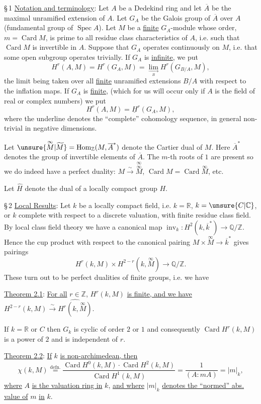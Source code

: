 
\S\,1 \uline{Notation and terminology}: Let $A$ be a Dedekind ring and let $\overline A$ be the maximal unramified extension of $A$. Let $G_A$ be the Galois group of $\overline A$ over $A$ (fundamental group of $\operatorname{Spec} A$). Let $M$ be a \uline{finite} $G_A$-module whose order, $m=\operatorname{Card} M$, is prime to all residue class characteristics of $A$, i.e. such that $\operatorname{Card} M$ is invertible in $A$. Suppose that $G_A$ operates continuously on $M$, i.e. that some open subgroup operates trivially. If $G_A$ is \uline{infinite}, we put
\[
H^r(A,M)=H^r(G_A,M)=\lim_{\underset B\longrightarrow} H^r(G_{B/A},M),
\]
the limit being taken over all \uline{finite} unramified extensions $B/A$ with respect to the inflation maps. If $G_A$ is \uline{finite}, (which for us will occur only if $A$ is the field of real or complex numbers) we put
\[
H^r(A,M)=\underline H^r(G_A,M),
\]
where the underline denotes the ``complete'' cohomology sequence, in general non-trivial in negative dimensions.

Let $\unsure{\overset{\infty}{M}|\widetilde M}=\operatorname{Hom}_{\mathbb Z}(M,\overline A^*)$ denote the Cartier dual of $M$. Here $\overline A^*$ denotes the group of invertible elements of $\overline A$. The $m$-th roots of $1$ are present so we do indeed have a perfect duality: $M\xrightarrow{\sim}\overset{\infty}{\overset{\infty}{M}}$, $\operatorname{Card} M=\operatorname{Card}\overset{\infty}{M}$, etc.

Let $\widehat H$ denote the  dual of a locally compact group $H$.

\S\,2 \uline{Local Results}: Let $k$ be a locally compact field, i.e. $k=\mathbb R$, $k=\unsure{C|\mathbb C}$, or $k$ complete with respect to a discrete valuation, with finite residue class field. By local class field theory we have a canonical map $\operatorname{inv}_k:H^2(k,\overline k^*)\longrightarrow\mathbb Q/\mathbb Z$. Hence the cup product with respect to the canonical pairing  $M\times\overset{\infty}{M}\longrightarrow\overline k^*$ gives pairings
\[
H^r(k,M)\times H^{2-r}(k,\overset{\infty}{M})\longrightarrow\mathbb Q/\mathbb Z.
\]
These turn out to be perfect dualities of finite groups, i.e. we have

\uline{Theorem 2.1}: \uline{For all} $r\in\mathbb Z$, $H^r(k,M)$ \uline{is finite, and we have}
$H^{2-r}(k,M)\xrightarrow{\sim}\widehat{H^r(k,\overset{\infty}{M})}$.

If $k=\mathbb R$ or $C$ then $G_k$ is cyclic of order $2$ or $1$ and consequently $\operatorname{Card} H^r(k,M)$ is a power of $2$ and is independent of $r$.

\uline{Theorem 2.2}: \uline{If} $k$ \uline{is non-archimedean, then}
\[
\chi(k,M)\overset{\mathrm{defn.}}{=}
\frac{\operatorname{Card} H^0(k,M)\cdot\operatorname{Card} H^2(k,M)}{\operatorname{Card} H^1(k,M)}
=\frac{1}{(A:mA)}=|m|_k,
\]
\uline{where} $A$ \uline{is the valuation ring in} $k$, \uline{and where} $|m|_k$ \uline{denotes the ``normed'' abs. value of} $m$ \uline{in} $k$.
